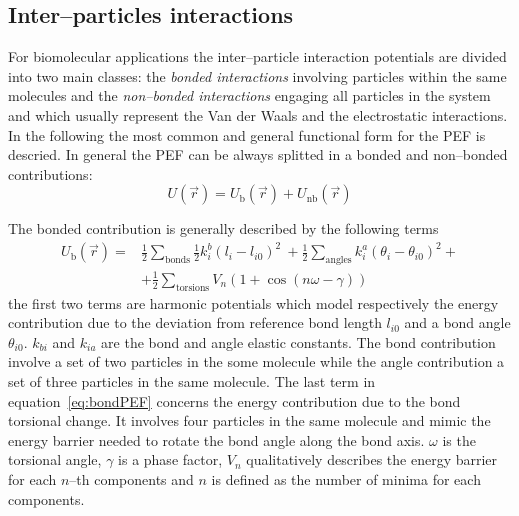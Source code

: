 \subsection{Inter--particles interactions}
For biomolecular applications the inter--particle interaction potentials are divided into two main classes: the
\textit{bonded interactions} involving particles within the same molecules and the \textit{non--bonded
interactions} engaging all particles in the system and which usually represent the Van der Waals and the
electrostatic interactions. In the following the most common and general functional form for the \ac{PEF} is
descried. In general the \ac{PEF} can be always splitted in a bonded and non--bonded contributions:
\begin{equation*}
	U(\vec r) = U_{\text{b}}(\vec r) + U_\text{nb}(\vec r)
	\label{eq:FFPEF}
\end{equation*}

The bonded contribution is generally described by the following terms
\begin{equation}
	\begin{aligned}
	U_{\text{b}}(\vec r) = &\frac{1}{2}\sum_{\text{bonds}} \frac{1}{2}k_i^b(l_i - l_{i0})^2\ + \frac{1}{2}\sum_{\text{angles}} k_i^a (\theta_i - \theta_{i0})^2 +\\
		 	& +\frac{1}{2}\sum_{\text{torsions}} V_n(1+\cos (n\omega - \gamma))
	\end{aligned}
	\label{eq:bondPEF}
\end{equation}
the first two terms are harmonic potentials which model respectively the energy contribution due to the deviation
from reference bond length $l_{i0}$ and a bond angle $\theta_{i0}$. $k_{bi}$ and $k_{ia}$ are the bond and angle
elastic constants. The bond contribution involve a set of two particles in the some molecule while the angle
contribution a set of three particles in the same molecule. The last term in equation~\eqref{eq:bondPEF} concerns
the energy contribution due to the bond torsional change. It involves four particles in the same molecule and
mimic the energy barrier needed to rotate the bond angle along the bond axis. $\omega$ is the torsional angle,
$\gamma$ is a phase factor, $V_n$ qualitatively describes the energy barrier for each $n$--th components and $n$
is defined as the number of minima for each components.

